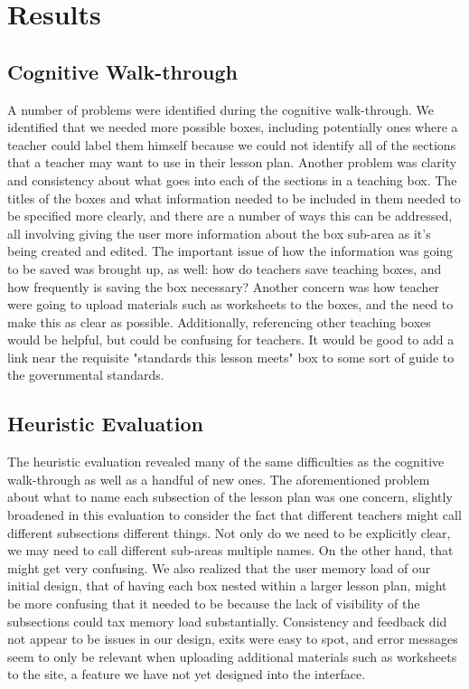 \documentclass[10pt,letter]{article}
\begin{document}
\section{Results}
\subsection{Cognitive Walk-through}
A number of problems were identified during the cognitive walk-through.  We
identified that we needed more possible boxes, including potentially ones where
a teacher could label them himself because we could not identify all of the
sections that a teacher may want to use in their lesson plan.  Another problem
was clarity and consistency about what goes into each of the sections in a
teaching box.  The titles of the boxes and what information needed to be
included in them needed to be specified more clearly, and there are a number of
ways this can be addressed, all involving giving the user more information about
the box sub-area as it's being created and edited.  The important issue of how
the information was going to be saved was brought up, as well: how do teachers
save teaching boxes, and how frequently is saving the box necessary?  Another
concern was how teacher were going to upload materials such as worksheets to the
boxes, and the need to make this as clear as possible.  Additionally,
referencing other teaching boxes would be helpful, but could be confusing for
teachers.  It would be good to add a link near the requisite "standards this
lesson meets" box to some sort of guide to the governmental standards.

\subsection{Heuristic Evaluation}
The heuristic evaluation revealed many of the same difficulties as the cognitive
walk-through as well as a handful of new ones.  The aforementioned problem about
what to name each subsection of the lesson plan was one concern, slightly
broadened in this evaluation to consider the fact that different teachers might
call different subsections different things.  Not only do we need to be
explicitly clear, we may need to call different sub-areas multiple names.  On
the other hand, that might get very confusing.  We also realized that the user
memory load of our initial design, that of having each box nested within a
larger lesson plan, might be more confusing that it needed to be because the
lack of visibility of the subsections could tax memory load substantially.
Consistency and feedback did not appear to be issues in our design, exits were
easy to spot, and error messages seem to only be relevant when uploading
additional materials such as worksheets to the site, a feature we have not yet
designed into the interface.
\end{document}
